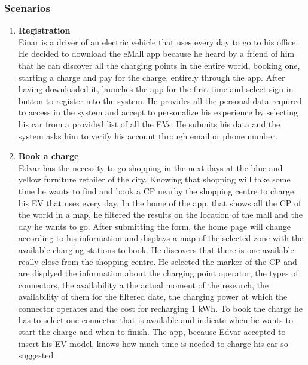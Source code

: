 \subsubsection{Scenarios}
\begin{enumerate}[label=\textbf{\Alph*}.]
      \item \textbf{Registration} \\
            Einar is a driver of an electric vehicle that uses every day to go to his
            office. He decided to download the eMall app because he heard by a friend
            of him that he can discover all the charging points in the entire world,
            booking one, starting a charge and pay for the charge, entirely through
            the app. After having downloaded it, launches the app for the first time
            and select sign in button to register into the system. He provides all
            the personal data required to access in the system and accept to personalize
            his experience by selecting his car from a provided list of all the EVs.
            He submits his data and the system asks him to verify his account through email or phone number.
      \item \textbf{Book a charge} \\
            Edvar has the necessity to go shopping in the next days at the blue and yellow furniture retailer of the city. Knowing
            that shopping will take some time he wants to find and book a CP nearby the shopping centre to charge his EV that uses every day.
            In the home of the app, that shows all the CP of the world in a map, he filtered the results on the location of the mall
            and the day he wants to go. After submitting the form, the home page will change according to his information and displays
            a map of the selected zone with the available charging stations to book. He discovers that there is one available
            really close from the shopping centre. He selected the marker of the CP and are displyed the information about the charging point operator,
            the types of connectors, the availability a the actual moment of the research, the availability of them for the filtered date,
            the charging power at which the connector operates and the cost for recharging 1 kWh.
            To book the charge he has to select one connector that is available and indicate when he wants to start the charge
            and when to finish. The app, because Edvar accepted to insert his EV model, knows how much time is needed to charge his car so suggested

\end{enumerate}
